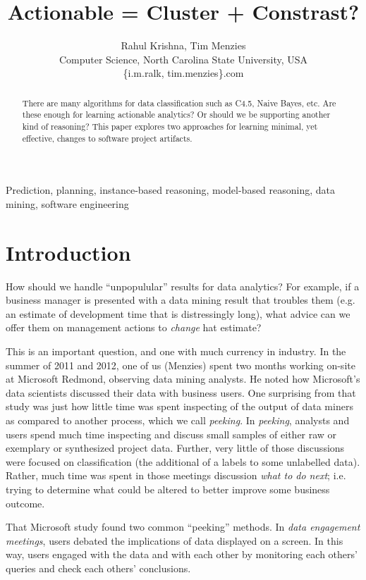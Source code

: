 \documentclass[conference]{IEEEtran}
\title{Actionable = Cluster + Constrast?}
\author{Rahul Krishna, Tim Menzies\\
	Computer Science, North Carolina State University, USA\\
	\{i.m.ralk, tim.menzies\}\@gmail.com
	
}
\begin{document}
	\maketitle
	\begin{abstract}
		There are many
		algorithms for data  classification such as  C4.5, Naive Bayes, etc.
		Are these enough for learning actionable analytics? Or should we be supporting
		another kind of reasoning? This paper explores
		two approaches for learning minimal, yet effective,  changes to software
		project artifacts.
	\end{abstract}
	\begin{IEEEkeywords}
		Prediction, planning, instance-based reasoning, model-based reasoning, data mining, software engineering
	\end{IEEEkeywords}
	
	\section{Introduction} 
	How should we handle ``unpopulular'' results
	for data analytics? For example, if a business manager is presented
	with a data mining result that troubles them (e.g. an estimate of
	development time that is distressingly long), what advice
	can we offer them on management actions to {\em change} hat estimate?
	
	This is an important question, and one with much currency in industry.
	In the summer of 2011 and 2012, one of us (Menzies) spent two months
	working on-site at Microsoft Redmond,
	observing data mining analysts.  He
	noted how Microsoft's data scientists
	discussed their data with  business users. 
	One surprising from that study was just how
	little time was spent  
	inspecting  of the output of data miners as compared to another process, which we call {\em peeking}.
	In {\em peeking}, analysts and users spend much time
	inspecting and discuss small samples of either raw or exemplary or synthesized project data.  Further, very little of those discussions were  focused on classification
	(the additional of a labels to some unlabelled data). Rather, much time
	was spent in those meetings discussion {\em what to do next}; i.e. trying
	to determine what could be altered to better improve some business outcome.
	
	That   Microsoft  study found two common ``peeking'' methods.
	In {\em data engagement meetings},
	users debated the implications of data
	displayed on a screen. In this way, users
	engaged with the data and with each other by
	monitoring each others' queries and check each others'
	conclusions.
	
\end{document}
